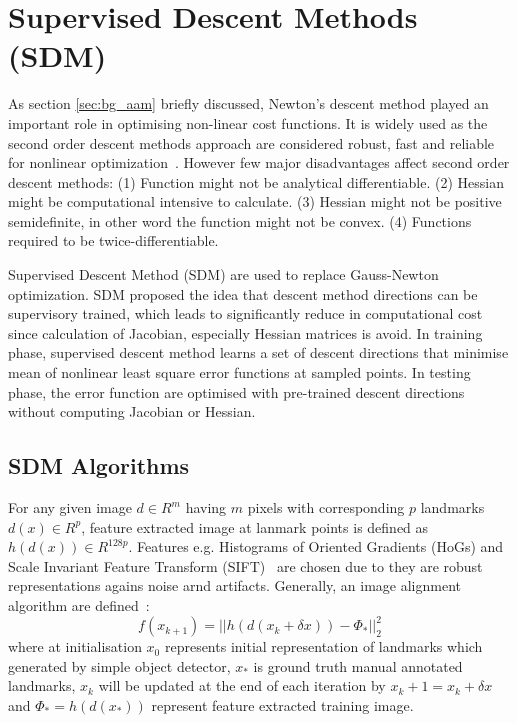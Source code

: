 \section{Supervised Descent Methods (SDM)}
\label{sec:SSD}
As section \ref{sec:bg_aam} briefly discussed, Newton's descent method played an important role in optimising non-linear cost functions. It is widely used as the second order descent methods approach are considered robust, fast and reliable for nonlinear optimization~\cite{Xiong2013}. However few major disadvantages affect second order descent methods: (1) Function might not be analytical differentiable. (2) Hessian might be computational intensive to calculate. (3) Hessian might not be positive semidefinite, in other word the function might not be convex. (4) Functions required to be twice-differentiable.

Supervised Descent Method (SDM) are used to replace Gauss-Newton optimization. SDM proposed the idea that descent method directions can be supervisory trained, which leads to significantly reduce in computational cost since calculation of Jacobian, especially Hessian matrices is avoid. In training phase, supervised descent method learns a set of descent directions that minimise mean of nonlinear least square error functions at sampled points. In testing phase, the error function are optimised with pre-trained descent directions without computing Jacobian or Hessian.


\subsection{SDM Algorithms}
\label{sec:SDMs}
For any given image $d \in R^{m}$ having $m$ pixels with corresponding $p$ landmarks $d(x) \in R^{p}$, feature extracted image at lanmark points is defined as $h(d(x)) \in R^{128p}$. Features e.g. Histograms of Oriented Gradients (HoGs) and Scale Invariant Feature Transform (SIFT)~\cite{Dalal2005,SIFT} are chosen due to they are robust representations agains noise arnd artifacts. Generally, an image alignment algorithm are defined~\cite{Xiong2013}:
\begin{equation}
\label{eq:ssdnd}
f(x_{k+1})=||h(d(x_k+\delta x))-\Phi_*||^2_2
\end{equation}
where at initialisation $x_0$ represents initial representation of landmarks which generated by simple object detector, $x_*$ is ground truth manual annotated landmarks, $x_k$ will be updated at the end of each iteration by $x_k+1=x_k + \delta x$ and $\Phi_* = h(d(x_*))$ represent feature extracted training image. 

